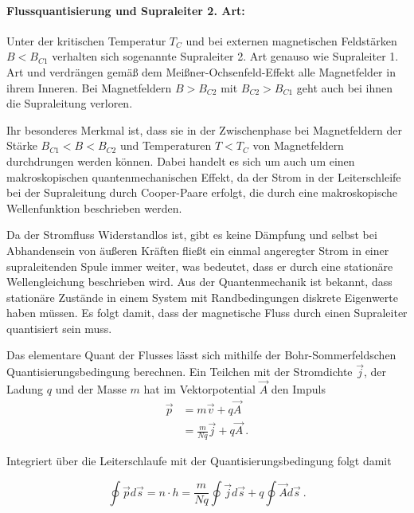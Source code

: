 \documentclass[a4paper,ngerman]{scrartcl}
\begin{document}
\paragraph{Flussquantisierung und Supraleiter 2. Art:}
Unter der kritischen Temperatur $T_C$ und bei externen magnetischen
Feldstärken $B < B_{C1}$ verhalten sich sogenannte Supraleiter 2. Art
genauso wie Supraleiter 1. Art und verdrängen gemäß dem
Meißner-Ochsenfeld-Effekt alle Magnetfelder in ihrem Inneren. 
Bei Magnetfeldern $B > B_{C2}$ mit $B_{C2} > B_{C1}$ geht auch bei
ihnen die Supraleitung verloren. 

Ihr besonderes Merkmal ist, dass sie in der Zwischenphase bei
Magnetfeldern der Stärke $B_{C1} < B < B_{C2}$ und Temperaturen $T <
T_C$ von Magnetfeldern durchdrungen werden können. 
Dabei handelt es sich um auch um einen makroskopischen
quantenmechanischen Effekt, da der Strom in der Leiterschleife bei der
Supraleitung durch Cooper-Paare erfolgt, die durch eine makroskopische
Wellenfunktion beschrieben werden. 


Da der Stromfluss Widerstandlos ist, gibt es keine Dämpfung und selbst
bei Abhandensein von äußeren Kräften fließt ein einmal angeregter
Strom in einer supraleitenden Spule immer weiter, was bedeutet, dass
er durch eine stationäre Wellengleichung beschrieben wird.
Aus der Quantenmechanik ist bekannt, dass stationäre Zustände in einem
System mit Randbedingungen diskrete Eigenwerte haben müssen.
Es folgt damit, dass der magnetische Fluss durch einen Supraleiter
quantisiert sein muss.

Das elementare Quant der Flusses lässt sich mithilfe der
Bohr-Sommerfeldschen Quantisierungsbedingung berechnen. 
Ein Teilchen mit der Stromdichte $\vec{j}$, der Ladung $q$ und der
Masse $m$ hat im Vektorpotential $\vec{A}$ den Impuls
\begin{equation}
  \begin{split}
      \vec{p} &= m \vec{v} + q \vec{A}\\
      &= \frac{m}{N q} \vec{j} + q \vec{A}~.
  \end{split}
\end{equation}

Integriert über die Leiterschlaufe mit der Quantisierungsbedingung
folgt damit

\begin{equation}
  \oint \vec{p} d\vec{s} = n \cdot h = \frac{m}{N q} \oint \vec{j}
  d\vec{s} + q \oint \vec{A} d\vec{s}~.
\end{equation}
\end{document}
